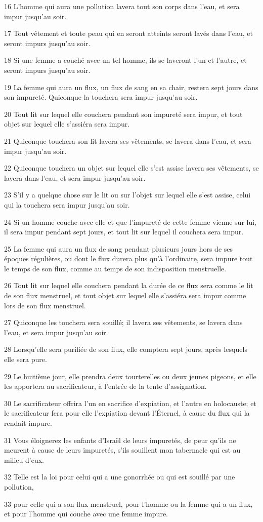 \par 16 L'homme qui aura une pollution lavera tout son corps dans l'eau, et sera impur jusqu'au soir.
\par 17 Tout vêtement et toute peau qui en seront atteints seront lavés dans l'eau, et seront impurs jusqu'au soir.
\par 18 Si une femme a couché avec un tel homme, ils se laveront l'un et l'autre, et seront impurs jusqu'au soir.
\par 19 La femme qui aura un flux, un flux de sang en sa chair, restera sept jours dans son impureté. Quiconque la touchera sera impur jusqu'au soir.
\par 20 Tout lit sur lequel elle couchera pendant son impureté sera impur, et tout objet sur lequel elle s'assiéra sera impur.
\par 21 Quiconque touchera son lit lavera ses vêtements, se lavera dans l'eau, et sera impur jusqu'au soir.
\par 22 Quiconque touchera un objet sur lequel elle s'est assise lavera ses vêtements, se lavera dans l'eau, et sera impur jusqu'au soir.
\par 23 S'il y a quelque chose sur le lit ou sur l'objet sur lequel elle s'est assise, celui qui la touchera sera impur jusqu'au soir.
\par 24 Si un homme couche avec elle et que l'impureté de cette femme vienne sur lui, il sera impur pendant sept jours, et tout lit sur lequel il couchera sera impur.
\par 25 La femme qui aura un flux de sang pendant plusieurs jours hors de ses époques régulières, ou dont le flux durera plus qu'à l'ordinaire, sera impure tout le temps de son flux, comme au temps de son indisposition menstruelle.
\par 26 Tout lit sur lequel elle couchera pendant la durée de ce flux sera comme le lit de son flux menstruel, et tout objet sur lequel elle s'assiéra sera impur comme lors de son flux menstruel.
\par 27 Quiconque les touchera sera souillé; il lavera ses vêtements, se lavera dans l'eau, et sera impur jusqu'au soir.
\par 28 Lorsqu'elle sera purifiée de son flux, elle comptera sept jours, après lesquels elle sera pure.
\par 29 Le huitième jour, elle prendra deux tourterelles ou deux jeunes pigeons, et elle les apportera au sacrificateur, à l'entrée de la tente d'assignation.
\par 30 Le sacrificateur offrira l'un en sacrifice d'expiation, et l'autre en holocauste; et le sacrificateur fera pour elle l'expiation devant l'Éternel, à cause du flux qui la rendait impure.
\par 31 Vous éloignerez les enfants d'Israël de leurs impuretés, de peur qu'ils ne meurent à cause de leurs impuretés, s'ils souillent mon tabernacle qui est au milieu d'eux.
\par 32 Telle est la loi pour celui qui a une gonorrhée ou qui est souillé par une pollution,
\par 33 pour celle qui a son flux menstruel, pour l'homme ou la femme qui a un flux, et pour l'homme qui couche avec une femme impure.

